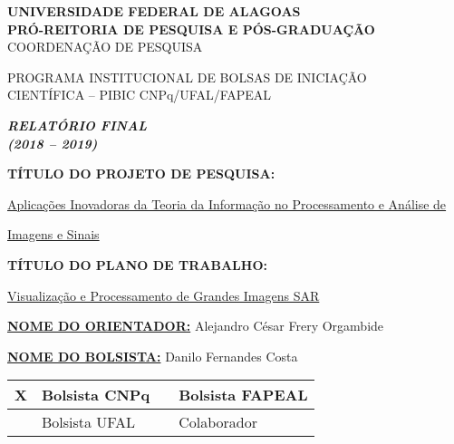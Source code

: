 \documentclass[12pt,letterpaper]{article}
\begin{document}
\onehalfspacing 
\thispagestyle{empty}

\begin{center}
\vspace{0.2cm}

\hrulefill

\textbf{UNIVERSIDADE FEDERAL DE ALAGOAS}\\
\textbf{PRÓ-REITORIA DE PESQUISA E PÓS-GRADUAÇÃO}\\
COORDENAÇÃO DE PESQUISA

\hrulefill

\vspace{0.5cm}

PROGRAMA INSTITUCIONAL DE BOLSAS DE INICIAÇÃO\\ CIENTÍFICA -- PIBIC CNPq/UFAL/FAPEAL

\vspace{1.0cm}

\textbf{\textit{\Large{RELATÓRIO FINAL \\ (2018 -- 2019)}}}\\

\vspace{1.2cm}

\textbf{TÍTULO DO PROJETO DE PESQUISA:}

\underline{Aplicações Inovadoras da Teoria da Informação no Processamento e Análise de}

\underline{Imagens e Sinais}

\vspace{0.6cm}

\textbf{TÍTULO DO PLANO DE TRABALHO:}

\underline{Visualização e Processamento de Grandes Imagens SAR}

\end{center}

\textbf{\underline{NOME DO ORIENTADOR:}} Alejandro César Frery Orgambide

\vspace{0.4cm}

\textbf{\underline{NOME DO BOLSISTA:}} Danilo Fernandes Costa

\vspace{1cm}

\begin{table}[!h]
\begin{center}
\begin{tabularx}{\textwidth}{|X|X|X|X|}
\hline                              
\hspace{1.3cm} X & Bolsista CNPq &  &Bolsista FAPEAL\\
\hline             
& Bolsista UFAL &  &Colaborador\\
\hline     
\end{tabularx}
\end{center}
\end{table}
\end{document}
